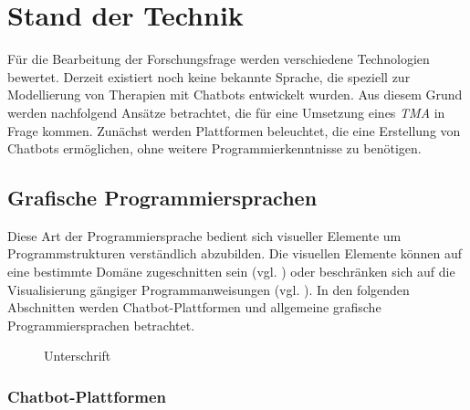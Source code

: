 
\section{Stand der Technik}
\label{ch:Forschungsstand}
Für die Bearbeitung der Forschungsfrage werden verschiedene Technologien bewertet.  Derzeit existiert noch keine bekannte Sprache, die speziell zur Modellierung von Therapien mit Chatbots entwickelt wurden. Aus diesem Grund werden nachfolgend Ansätze betrachtet, die für eine Umsetzung eines \emph{TMA} in Frage kommen. Zunächst werden Plattformen beleuchtet, die eine Erstellung von Chatbots ermöglichen, ohne weitere Programmierkenntnisse zu benötigen. 

\subsection{Grafische Programmiersprachen}
Diese Art der Programmiersprache bedient sich visueller Elemente um Programmstrukturen verständlich abzubilden. Die visuellen Elemente können auf eine bestimmte Domäne zugeschnitten sein (vgl. \cite{WasistLa94:online}) oder beschränken sich auf die Visualisierung gängiger Programmanweisungen (vgl. \cite{BlocklyG57:online}). In den folgenden Abschnitten werden Chatbot-Plattformen und allgemeine grafische Programmiersprachen betrachtet.

\begin{figure}[h]
\centering
{}
\caption{Unterschrift}
\label{grafProg}
\end{figure}

\subsubsection{Chatbot-Plattformen}

